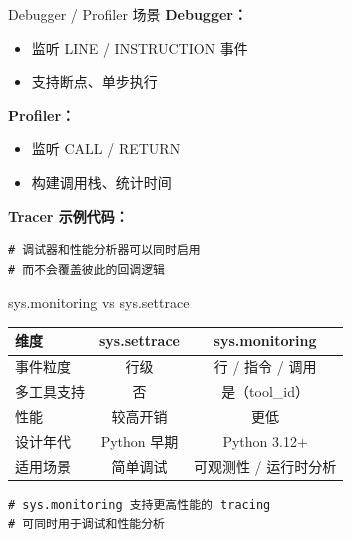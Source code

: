 \documentclass{beamer}
\begin{document}
\begin{frame}[fragile]{Debugger / Profiler 场景}
\textbf{Debugger：}
\begin{itemize}
  \item 监听 LINE / INSTRUCTION 事件
  \item 支持断点、单步执行
\end{itemize}

\textbf{Profiler：}
\begin{itemize}
  \item 监听 CALL / RETURN
  \item 构建调用栈、统计时间
\end{itemize}

\textbf{Tracer 示例代码：}
\begin{verbatim}
# 调试器和性能分析器可以同时启用
# 而不会覆盖彼此的回调逻辑
\end{verbatim}
\end{frame}

\begin{frame}[fragile]{sys.monitoring vs sys.settrace}
\begin{tabular}{l|c|c}
维度 & sys.settrace & sys.monitoring \\
\hline
事件粒度 & 行级 & 行 / 指令 / 调用 \\
多工具支持 & 否 & 是（tool\_id） \\
性能 & 较高开销 & 更低 \\
设计年代 & Python 早期 & Python 3.12+ \\
适用场景 & 简单调试 & 可观测性 / 运行时分析 \\
\end{tabular}

\begin{verbatim}
# sys.monitoring 支持更高性能的 tracing
# 可同时用于调试和性能分析
\end{verbatim}
\end{frame}
\end{document}
